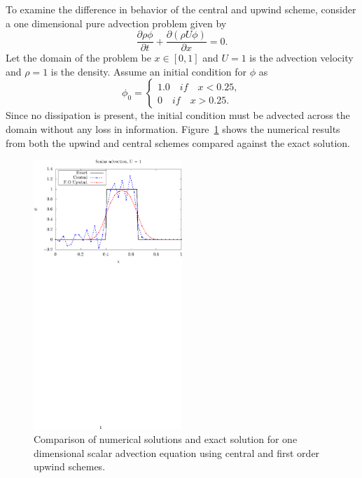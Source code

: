 To examine the difference in behavior of the central and upwind scheme, consider a one dimensional pure advection problem given by
\begin{equation}
\frac{\partial \rho \phi}{\partial t} + \frac{\partial (\rho U \phi)}{\partial x} = 0.
\label{eq:advecphieqn}
\end{equation}
Let the domain of the problem be $x \in [0,1]$ and $U=1$ is the advection velocity and $\rho=1$ is the density. Assume an initial condition for $\phi$ as
\begin{equation}
\phi_0 = \begin{cases}
1.0 \quad if \quad x < 0.25, \\
0 \quad if \quad x > 0.25.
\end{cases}
\end{equation}
Since no dissipation is present, the initial condition must be advected across the domain without any loss in information. Figure~\ref{fig:upwcen} shows the numerical results from both the upwind and central schemes compared against the exact solution.
\begin{figure}[h]
\centering
\captionsetup{justification=centering}
 \includegraphics[trim=0 390 0 0,clip, width=0.5\textwidth]{ch2_litsurvey/Figures/box_cen_fo.eps}
\caption{Comparison of numerical solutions and exact solution for one dimensional scalar advection equation using central and first order upwind schemes.}
 \label{fig:upwcen}
\end{figure}
